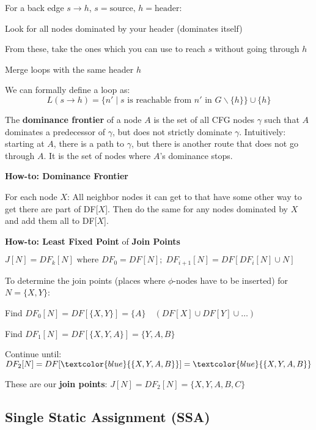 For a back edge $s \rightarrow h$, $s=\text{source, }h=\text{header}$:
\begin{compactitem}[$\quad\bullet$]
	\item Look for all nodes dominated by your header (dominates itself)
	\item From these, take the ones which you can use to reach $s$ without going through $h$
	\item Merge loops with the same header $h$
\end{compactitem}\smallskip

We can formally define a loop as:
$$L(s \to h) = \{ n' \; | \; s \text{ is reachable from } n' \text{ in } G
	\backslash\{h\}  \} \cup \{h\}$$

\vspace{3pt}
The \textbf{dominance frontier} of a node $A$ is the set of all CFG nodes
$\gamma$ such that $A$ dominates a predecessor of $\gamma$, but does not
strictly dominate $\gamma$. Intuitively: starting at $A$, there is a path to $\gamma$, but there is another route that does not go through $A$. It is the set of nodes where $A$'s dominance stops. \medskip

\textbf{How-to: Dominance Frontier}

For each node $X$: All neighbor nodes it can get to that have some other way to get there
are part of DF[$X$]. Then do the same for any nodes dominated by $X$ and add them all
to DF[$X$].\medskip

\textbf{How-to: Least Fixed Point} of \textbf{Join Points}

$J[N] = DF_k[N] \text{ where } DF_0 = DF[N];\; DF_{i+1}[N] = DF[DF_i[N] \cup N]$

\begin{minipage}{\columnwidth} %

	To determine the join points (places where $\phi$-nodes have to be inserted)
	for $N = \{X,Y\}$:
	\begin{compactitem}[$\quad\bullet$]
		\item Find $DF_0[N] = DF[\{X,Y\}] = \{A\} \quad(DF[X] \cup DF[Y] \cup \ldots)$
		\item Find $DF_1[N] = DF[\{X, Y, A\}] = \{Y,A,B\}$
		\item Continue until: $DF_2[N] = DF[\textcolor{blue}{\{X,Y,A,B\}}] = \textcolor{blue}{\{X,Y,A,B\}}$
		\item These are our \textbf{join points}: $J[N] = DF_2[N] = \{X,Y,A,B,C\}$
	\end{compactitem}

	\subsection*{Single Static Assignment (SSA)}
\end{minipage}

